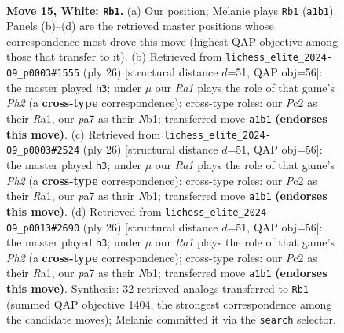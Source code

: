 \documentclass[11pt]{article}
\begin{document}
\begin{figure}[p]\centering
\begin{subfigure}{0.46\textwidth}\centering
\resizebox{\linewidth}{!}{%
\newchessgame
\chessboard[
  setfen={1rb2qk1/p1pp1ppp/3n1b2/1p6/3P2P1/NP6/P1P2P1P/R1BQ1BK1 w - - 3 15},
  showmover=false,
  pgfstyle=straightmove, color=movearrow, markmove={a1-b1}
]}
\caption{}
\end{subfigure}\hfill
\begin{subfigure}{0.46\textwidth}\centering
\resizebox{\linewidth}{!}{%
\newchessgame
\chessboard[
  setfen={r1bq2k1/ppp2ppp/3p1b2/5n2/3P1B2/2P5/PP3PPP/RN2QBK1 w - - 0 14},
  showmover=false,
  pgfstyle=straightmove, color=movearrow, markmove={h2-h3}
]}
\caption{}
\end{subfigure}
\\[4pt]
\begin{subfigure}{0.46\textwidth}\centering
\resizebox{\linewidth}{!}{%
\newchessgame
\chessboard[
  setfen={r1bq2k1/ppp2ppp/3p1b2/5n2/3P1B2/2P5/PP3PPP/RN2QBK1 w - - 0 14},
  showmover=false,
  pgfstyle=straightmove, color=movearrow, markmove={h2-h3}
]}
\caption{}
\end{subfigure}\hfill
\begin{subfigure}{0.46\textwidth}\centering
\resizebox{\linewidth}{!}{%
\newchessgame
\chessboard[
  setfen={r1bq2k1/ppp2ppp/3p1b2/5n2/3P1B2/2P5/PP3PPP/RN2QBK1 w - - 0 14},
  showmover=false,
  pgfstyle=straightmove, color=movearrow, markmove={h2-h3}
]}
\caption{}
\end{subfigure}
\caption{\textbf{Move 15, White: \texttt{Rb1}.} (a) Our position; Melanie plays \texttt{Rb1} (\texttt{a1b1}). Panels (b)--(d) are the retrieved master positions whose correspondence most drove this move (highest QAP objective among those that transfer to it). (b) Retrieved from \texttt{lichess\_elite\_2024-09\_p0003\#1555} (ply 26) [structural distance $d$=51, QAP obj=56]: the master played \texttt{h3}; under $\mu$ our \emph{Ra1} plays the role of that game's \emph{Ph2} (a \textbf{cross-type} correspondence); cross-type roles: our \emph{P}c2 as their \emph{R}a1, our \emph{p}a7 as their \emph{N}b1; transferred move \texttt{a1b1} \textbf{(endorses this move)}. (c) Retrieved from \texttt{lichess\_elite\_2024-09\_p0003\#2524} (ply 26) [structural distance $d$=51, QAP obj=56]: the master played \texttt{h3}; under $\mu$ our \emph{Ra1} plays the role of that game's \emph{Ph2} (a \textbf{cross-type} correspondence); cross-type roles: our \emph{P}c2 as their \emph{R}a1, our \emph{p}a7 as their \emph{N}b1; transferred move \texttt{a1b1} \textbf{(endorses this move)}. (d) Retrieved from \texttt{lichess\_elite\_2024-09\_p0013\#2690} (ply 26) [structural distance $d$=51, QAP obj=56]: the master played \texttt{h3}; under $\mu$ our \emph{Ra1} plays the role of that game's \emph{Ph2} (a \textbf{cross-type} correspondence); cross-type roles: our \emph{P}c2 as their \emph{R}a1, our \emph{p}a7 as their \emph{N}b1; transferred move \texttt{a1b1} \textbf{(endorses this move)}. Synthesis: 32 retrieved analogs transferred to \texttt{Rb1} (summed QAP objective 1404, the strongest correspondence among the candidate moves); Melanie committed it via the \texttt{search} selector.}
\label{fig:thought-m28}
\end{figure}
\end{document}
